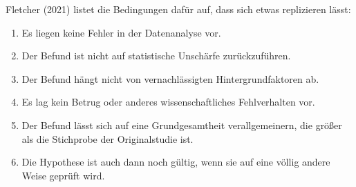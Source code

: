\documentclass[
  letterpaper,
  DIV=11,
  numbers=noendperiod]{scrreprt}
\begin{document}
Fletcher (2021) listet die Bedingungen dafür auf, dass sich etwas
replizieren lässt:

\begin{enumerate}
\def\labelenumi{\arabic{enumi}.}
\item
  Es liegen keine Fehler in der Datenanalyse vor.
\item
  Der Befund ist nicht auf statistische Unschärfe zurückzuführen.
\item
  Der Befund hängt nicht von vernachlässigten Hintergrundfaktoren ab.
\item
  Es lag kein Betrug oder anderes wissenschaftliches Fehlverhalten vor.
\item
  Der Befund lässt sich auf eine Grundgesamtheit verallgemeinern, die
  größer als die Stichprobe der Originalstudie ist.
\item
  Die Hypothese ist auch dann noch gültig, wenn sie auf eine völlig
  andere Weise geprüft wird.~
\end{enumerate}
\end{document}
